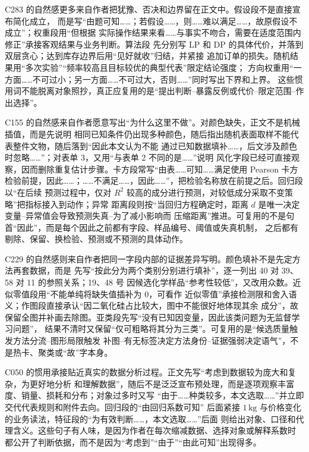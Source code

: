 C283 的自然感更多来自作者把犹豫、否决和边界留在正文中。假设段不是直接宣布简化成立，
而是写“由题可知……；若假设……，则……难以满足……，故原假设不成立”；权重段用“但根据
实际操作结果来看……与事实不吻合，需要在适度范围内修正”承接客观结果与业务判断。算法段
先分别写 LP 和 DP 的具体代价，并落到双层贪心；达到库存边界后用“见好就收”归结，并紧接
追加订单的损失。随机结果用“多次实验”“频率较高且目标较优的典型代表”限定结论强度；
方向权重用“一方面……不可过小；另一方面……不可过大，否则……”同时写出下界和上界。
这些惯用词不能脱离对象照抄，真正应复用的是“提出判断--暴露反例或代价--限定范围--作出选择”。

C155 的自然感来自作者愿意写出“为什么这里不做”。对颜色缺失，正文不是机械插值，而是先说明
相同已知条件仍出现多种颜色，随后指出随机表面取样不能代表整件文物，随后落到“因此本文认为不能
通过已知数据填补……，后文涉及颜色时忽略……”；对表单 3，又用“与表单 2 不同的是……”说明
风化字段已经可直接观察，因而删除重复估计步骤。卡方段常写“由表……可知……满足使用 Pearson
卡方检验前提，因此……；……不满足……，因此……”，把检验名称放在前提之后。回归段以“在后续
预测过程中，仅对 $R^2$ 较高的成分进行预测，对较低成分采取不变策略”把指标接入到动作；异常
距离段则按“当回归方程确定时，距离 $d$ 是唯一决定变量--异常值会导致预测失真--为了减小影响而
压缩距离”推进。可复用的不是句首“因此”，而是每个因此之前都有字段、样品编号、阈值或失真机制，
之后都有剔除、保留、换检验、预测或不预测的具体动作。

C229 的自然感则来自作者把同一字段内部的证据差异写明。颜色填补不是先定方法再套数据，而是
先写“按此分为两个类别分别进行填补”，逐一列出 40 对 39、58 对 11 的参照关系；19、48 号
因候选化学样品“参考性较低”，又改用众数。近似零值段用“不能单纯将缺失值插补为 0，可看作
近似零值”承接检测限和舍入语义；作图段直接承认“因二氧化硅占比较大，图中不能很好地体现其余
成分”，故保留全图并补画去除图。亚类段先写“没有已知因变量，因此该类问题为无监督学习问题”，
结果不清时又保留“仅可粗略将其分为三类”。可复用的是“候选质量触发方法分流--图形局限触发
补图--有无标签决定方法身份--证据强弱决定语气”，不是热卡、聚类或“故”字本身。

C050 的惯用承接贴近真实的数据分析过程。正文先写“考虑到数据较为庞大和复杂，为更好地分析
和理解数据”，随后不是泛泛宣布预处理，而是逐项观察丰富度、销量、损耗和分布；对象过多时又写
“由于……种类较多，本文选取……”并立即交代代表规则和附件去向。回归段的“由回归系数可知”
后面紧接 $1\,\mathrm{kg}$ 与价格变化的业务读法，特征段的“为有效判断……，本文选取……”后面
则给出对象、口径和代理含义。这些句子有人味，是因为作者在每次缩减数据、选择对象或解释系数时
都公开了判断依据，而不是因为“考虑到”“由于”“由此可知”出现得多。

